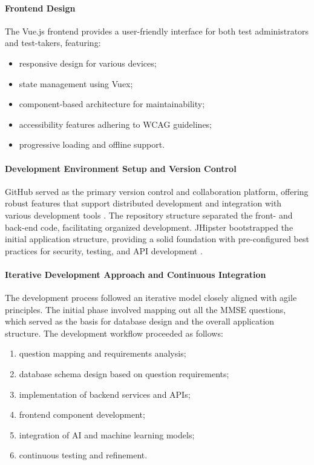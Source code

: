 \paragraph{Frontend Design}
The Vue.js frontend provides a user-friendly interface for both test administrators and test-takers, featuring:
\begin{itemize}
\item responsive design for various devices;
\item state management using Vuex;
\item component-based architecture for maintainability;
\item accessibility features adhering to WCAG guidelines;
\item progressive loading and offline support.
\end{itemize}

\paragraph{Development Environment Setup and Version Control}
GitHub served as the primary version control and collaboration platform, offering robust features that support distributed development and integration with various development tools \cite{github}. The repository structure separated the front- and back-end code, facilitating organized development. JHipster bootstrapped the initial application structure, providing a solid foundation with pre-configured best practices for security, testing, and API development \cite{jhipster}.

\paragraph{Iterative Development Approach and Continuous Integration}
The development process followed an iterative model closely aligned with agile principles. The initial phase involved mapping out all the MMSE questions, which served as the basis for database design and the overall application structure. The development workflow proceeded as follows:
\begin{enumerate}
\item question mapping and requirements analysis;
\item database schema design based on question requirements;
\item implementation of backend services and APIs;
\item frontend component development;
\item integration of AI and machine learning models;
\item continuous testing and refinement.
\end{enumerate}

